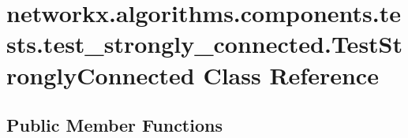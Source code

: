 \hypertarget{classnetworkx_1_1algorithms_1_1components_1_1tests_1_1test__strongly__connected_1_1TestStronglyConnected}{}\section{networkx.\+algorithms.\+components.\+tests.\+test\+\_\+strongly\+\_\+connected.\+Test\+Strongly\+Connected Class Reference}
\label{classnetworkx_1_1algorithms_1_1components_1_1tests_1_1test__strongly__connected_1_1TestStronglyConnected}
\subsection*{Public Member Functions}
